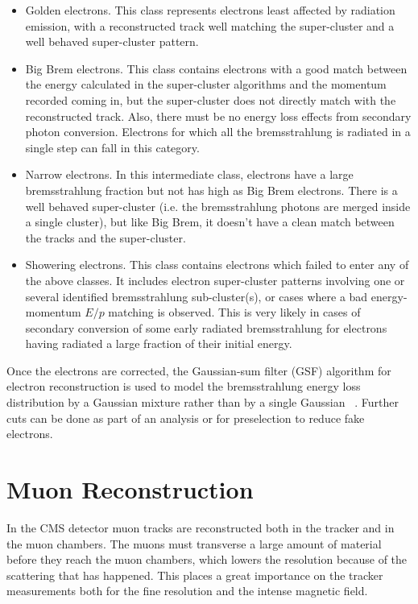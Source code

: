 \begin{itemize}
\item
  Golden electrons. This class represents electrons least affected by radiation emission, with a reconstructed track well matching the super-cluster and a well behaved super-cluster pattern. 
\item
  Big Brem electrons. This class contains electrons with a good match between the energy calculated in the super-cluster algorithms and the momentum recorded coming in, but the super-cluster does not directly match with the reconstructed track.  Also, there must be no energy loss effects from secondary photon conversion. Electrons for which all the bremsstrahlung is radiated in a single step can fall in this category.
\item
  Narrow electrons. In this intermediate class, electrons have a large bremsstrahlung fraction but not has high as Big Brem electrons.  There is a well behaved super-cluster (i.e. the bremsstrahlung photons are merged inside a single cluster), but like Big Brem, it doesn't have a clean match between the tracks and the super-cluster.
\item
  Showering electrons. This class contains electrons which failed to enter any of the above classes. It includes electron super-cluster patterns involving one or several identified bremsstrahlung sub-cluster(s), or cases where a bad energy-momentum $E/p$ matching is observed. This is very likely in cases of secondary conversion of some early radiated bremsstrahlung for electrons having radiated a large fraction of their initial energy.
\end{itemize}

Once the electrons are corrected, the Gaussian-sum filter (GSF) algorithm for electron reconstruction is used to model the bremsstrahlung energy loss distribution by a Gaussian mixture rather than by a single Gaussian ~\cite{GSF_at_CMS}. Further cuts can be done as part of an analysis or for preselection to reduce fake electrons.

\section{Muon Reconstruction}

In the CMS detector muon tracks are reconstructed both in the tracker and in the muon chambers.  The muons must transverse a large amount of material before they reach the muon chambers, which lowers the resolution because of the scattering that has happened. This places a great importance on the tracker measurements both for the fine resolution and the intense magnetic field. 

